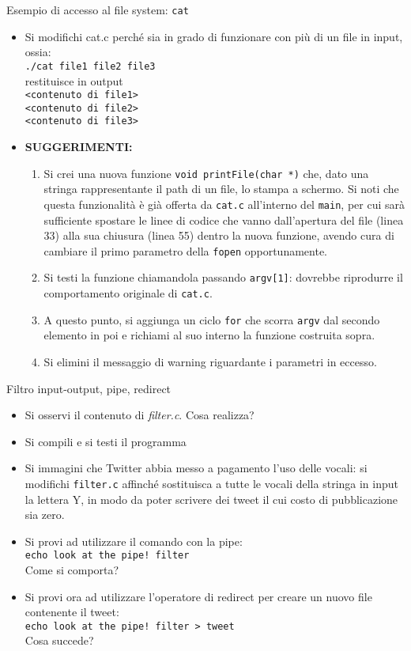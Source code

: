 \documentclass{beamer}
\begin{document}
\begin{frame}[fragile]{Esempio di accesso al file system: \texttt{cat}}
\begin{itemize}
 \item Si modifichi cat.c perché sia in grado di funzionare con più di un file in input, ossia: \\ \texttt{./cat file1 file2 file3} \\ restituisce in output \\ \texttt{<contenuto di file1> \\ <contenuto di file2> \\ <contenuto di file3>}
 \item \textbf{SUGGERIMENTI:}
 \begin{enumerate}
 \scriptsize
  \item Si crei una nuova funzione \texttt{void printFile(char *)} che, dato una stringa rappresentante il path di un file, lo stampa a schermo. Si noti che questa funzionalità è già offerta da \texttt{cat.c} all'interno del \texttt{main}, per cui sarà sufficiente spostare le linee di codice che vanno dall'apertura del file (linea 33) alla sua chiusura (linea 55) dentro la nuova funzione, avendo cura di cambiare il primo parametro della \texttt{fopen} opportunamente.
 \scriptsize
  \item Si testi la funzione chiamandola passando \texttt{argv[1]}: dovrebbe riprodurre il comportamento originale di \texttt{cat.c}.
 \scriptsize
  \item A questo punto, si aggiunga un ciclo \texttt{for} che scorra \texttt{argv} dal secondo elemento in poi e richiami al suo interno la funzione costruita sopra.
 \scriptsize
  \item Si elimini il messaggio di warning riguardante i parametri in eccesso.
 \end{enumerate}
\end{itemize}
\end{frame}

\begin{frame}[fragile]{Filtro input-output, pipe, redirect}
\begin{itemize}
 \item Si osservi il contenuto di \emph{filter.c}. Cosa realizza?
 \item Si compili e si testi il programma
 \item Si immagini che Twitter abbia messo a pagamento l'uso delle vocali: si modifichi \texttt{filter.c} affinché sostituisca a tutte le vocali della stringa in input la lettera Y, in modo da poter scrivere dei tweet il cui costo di pubblicazione sia zero.
 \item Si provi ad utilizzare il comando con la pipe: \\ \texttt{echo look at the pipe! \textbar{} filter} \\ Come si comporta?
 \item Si provi ora ad utilizzare l'operatore di redirect per creare un nuovo file contenente il tweet: \\ \texttt{echo look at the pipe! \textbar{} filter > tweet} \\ Cosa succede?
\end{itemize}
\end{frame}
\end{document}

